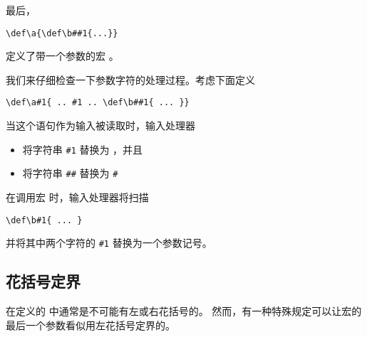 \documentclass[letterpaper]{book}
\begin{document}
最后，
\begin{verbatim}
\def\a{\def\b##1{...}}
\end{verbatim}
定义了带一个参数的宏 。

我们来仔细检查一下参数字符的处理过程。考虑下面定义
\begin{verbatim}
\def\a#1{ .. #1 .. \def\b##1{ ... }}
\end{verbatim}
当这个语句作为输入被读取时，输入处理器
\begin{itemize}
\item 将字符串 \verb>#1> 替换为 ，并且
\item 将字符串 \verb>##> 替换为 \verb>#>
\end{itemize}
在调用宏  时，输入处理器将扫描
\begin{verbatim}
\def\b#1{ ... }
\end{verbatim}
并将其中两个字符的 \verb>#1> 替换为一个参数记号。

\subsection{花括号定界}

在定义的  中通常是不可能有左或右花括号的。
然而，有一种特殊规定可以让宏的最后一个参数看似用左花括号定界的。
\end{document}
